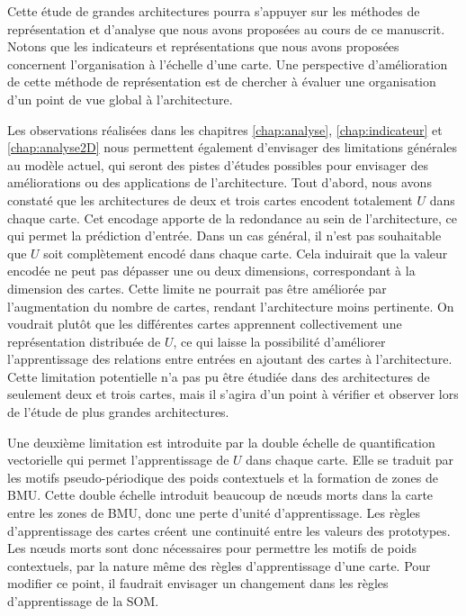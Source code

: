 Cette étude de grandes architectures pourra s'appuyer sur les méthodes de représentation et d'analyse que nous avons proposées au cours de ce manuscrit. 
Notons que les indicateurs et représentations que nous avons proposées concernent l'organisation à l'échelle d'une carte. Une perspective d'amélioration de cette méthode de représentation est de chercher à évaluer une organisation d'un point de vue global à l'architecture.


Les observations réalisées dans les chapitres \ref{chap:analyse}, \ref{chap:indicateur} et \ref{chap:analyse2D} nous permettent également d'envisager des limitations générales au modèle actuel, qui seront des pistes d'études possibles pour envisager des améliorations ou des applications de l'architecture.
Tout d'abord, nous avons constaté que les architectures de deux et trois cartes encodent totalement $U$ dans chaque carte.
Cet encodage apporte de la redondance au sein de l'architecture, ce qui permet la prédiction d'entrée.
Dans un cas général, il n'est pas souhaitable que $U$ soit complètement encodé dans chaque carte.
Cela induirait que la valeur encodée ne peut pas dépasser une ou deux dimensions, correspondant à la dimension des cartes. Cette limite ne pourrait pas être améliorée par l'augmentation du nombre de cartes, rendant l'architecture moins pertinente. 
On voudrait plutôt que les différentes cartes apprennent collectivement une représentation distribuée de $U$, ce qui laisse la possibilité d'améliorer l'apprentissage des relations entre entrées en ajoutant des cartes à l'architecture. Cette limitation potentielle n'a pas pu être étudiée dans des architectures de seulement deux et trois cartes, mais il s'agira d'un point à vérifier et observer lors de l'étude de plus grandes architectures. 

Une deuxième limitation est introduite par la double échelle de quantification vectorielle qui permet l'apprentissage de $U$ dans chaque carte. Elle se traduit par les motifs pseudo-périodique des poids contextuels et la formation de zones de BMU.
Cette double échelle introduit beaucoup de n\oe{}uds morts dans la carte entre les zones de BMU, donc une perte d'unité d'apprentissage.
Les règles d'apprentissage des cartes créent une continuité entre les valeurs des prototypes.  Les n\oe{}uds morts sont donc nécessaires pour permettre les motifs de poids contextuels, par la nature même des règles d'apprentissage d'une carte.
Pour modifier ce point, il faudrait envisager un changement dans les règles d'apprentissage de la SOM.

